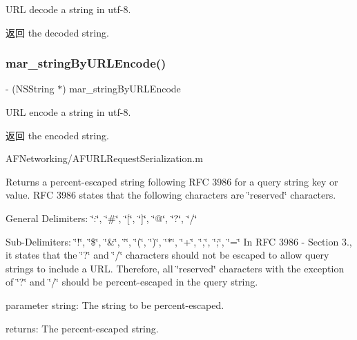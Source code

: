 U\+RL decode a string in utf-\/8. \begin{DoxyReturn}{返回}
the decoded string. 
\end{DoxyReturn}
\mbox{\label{category_n_s_string_07_m_a_r_e_x_08_a6c03a4e04450369c3359a28e22e09019}} 
\subsubsection{\texorpdfstring{mar\+\_\+string\+By\+U\+R\+L\+Encode()}{mar\_stringByURLEncode()}}
{\footnotesize\ttfamily -\/ (N\+S\+String $\ast$) mar\+\_\+string\+By\+U\+R\+L\+Encode \begin{DoxyParamCaption}{ }\end{DoxyParamCaption}}

U\+RL encode a string in utf-\/8. \begin{DoxyReturn}{返回}
the encoded string. 
\end{DoxyReturn}
A\+F\+Networking/\+A\+F\+U\+R\+L\+Request\+Serialization.\+m

Returns a percent-\/escaped string following R\+FC 3986 for a query string key or value. R\+FC 3986 states that the following characters are \char`\"{}reserved\char`\"{} characters.
\begin{DoxyItemize}
\item General Delimiters\+: \char`\"{}\+:\char`\"{}, \char`\"{}\#\char`\"{}, \char`\"{}\mbox{[}\char`\"{}, \char`\"{}\mbox{]}\char`\"{}, \char`\"{}@\char`\"{}, \char`\"{}?\char`\"{}, \char`\"{}/\char`\"{}
\item Sub-\/\+Delimiters\+: \char`\"{}!\char`\"{}, \char`\"{}\$\char`\"{}, \char`\"{}\&\char`\"{}, \char`\"{}\textquotesingle{}\char`\"{}, \char`\"{}(\char`\"{}, \char`\"{})\char`\"{}, \char`\"{}$\ast$\char`\"{}, \char`\"{}+\char`\"{}, \char`\"{},\char`\"{}, \char`\"{};\char`\"{}, \char`\"{}=\char`\"{} In R\+FC 3986 -\/ Section 3., it states that the \char`\"{}?\char`\"{} and \char`\"{}/\char`\"{} characters should not be escaped to allow query strings to include a U\+RL. Therefore, all \char`\"{}reserved\char`\"{} characters with the exception of \char`\"{}?\char`\"{} and \char`\"{}/\char`\"{} should be percent-\/escaped in the query string.
\item parameter string\+: The string to be percent-\/escaped.
\item returns\+: The percent-\/escaped string.
\end{DoxyItemize}\mbox{\label{category_n_s_string_07_m_a_r_e_x_08_a14b49133e6fc3cda4a6e42bb6f3c78c0}} 
